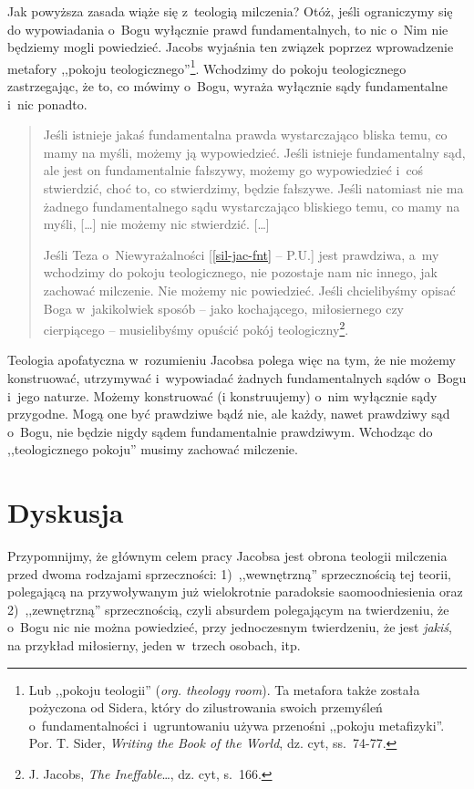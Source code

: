 Jak powyższa zasada wiąże się z~teologią milczenia? Otóż, jeśli ograniczymy się do wypowiadania o~Bogu wyłącznie prawd fundamentalnych, to nic o~Nim nie będziemy mogli powiedzieć. Jacobs wyjaśnia ten związek poprzez wprowadzenie metafory ,,pokoju teologicznego''\footnote{Lub ,,pokoju teologii'' (\textit{org. theology room}). Ta metafora także została pożyczona od Sidera, który do zilustrowania swoich przemyśleń o~fundamentalności i~ugruntowaniu używa przenośni ,,pokoju metafizyki''. Por. T. Sider, \textit{Writing the Book of the World}, dz. cyt, ss.~74-77.}. Wchodzimy do pokoju teologicznego zastrzegając, że to, co mówimy o~Bogu, wyraża wyłącznie sądy fundamentalne i~nic ponadto.

\begin{quote}
Jeśli istnieje jakaś fundamentalna prawda wystarczająco bliska temu, co mamy na myśli, możemy ją wypowiedzieć. Jeśli istnieje fundamentalny sąd, ale jest on fundamentalnie fałszywy, możemy go wypowiedzieć i~coś stwierdzić, choć to, co stwierdzimy, będzie fałszywe. Jeśli natomiast nie ma żadnego fundamentalnego sądu wystarczająco bliskiego temu, co mamy na myśli, [\ldots] nie możemy nic stwierdzić. [\ldots]

Jeśli Teza o~Niewyrażalności [\ref{sil-jac-fnt} -- P.U.] jest prawdziwa, a~my wchodzimy do pokoju teologicznego, nie pozostaje nam nic innego, jak zachować milczenie. Nie możemy nic powiedzieć. Jeśli chcielibyśmy opisać Boga w~jakikolwiek sposób -- jako kochającego, miłosiernego czy cierpiącego -- musielibyśmy opuścić pokój teologiczny\footnote{J. Jacobs, \textit{The Ineffable}\ldots, dz. cyt, s.~166.}.
\end{quote}

Teologia apofatyczna w~rozumieniu Jacobsa polega więc na tym, że nie możemy konstruować, utrzymywać i~wypowiadać żadnych fundamentalnych sądów o~Bogu i~jego naturze. Możemy konstruować (i konstruujemy) o~nim wyłącznie sądy przygodne. Mogą one być prawdziwe bądź nie, ale każdy, nawet prawdziwy sąd o~Bogu, nie będzie nigdy sądem fundamentalnie prawdziwym. Wchodząc do ,,teologicznego pokoju'' musimy zachować milczenie.


\section{Dyskusja}

Przypomnijmy, że głównym celem pracy Jacobsa jest obrona teologii milczenia przed dwoma rodzajami sprzeczności: 1)~,,wewnętrzną'' sprzecznością tej teorii, polegającą na przywoływanym już wielokrotnie paradoksie saomoodniesienia oraz 2)~,,zewnętrzną'' sprzecznością, czyli absurdem polegającym na twierdzeniu, że o~Bogu nic nie można powiedzieć, przy jednoczesnym twierdzeniu, że jest \textit{jakiś}, na przykład miłosierny, jeden w~trzech osobach, itp.

